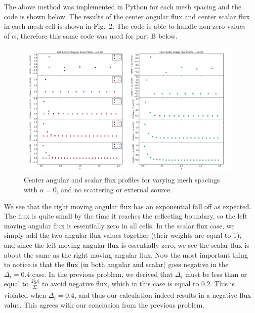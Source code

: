 \documentclass[10pt]{article}
\begin{document}
The above method was implemented in Python for each mesh spacing and the code is shown below. The results of the center angular flux and center scalar flux in each mesh cell is shown in Fig.~2. The code is able to handle non-zero values of $\alpha$, therefore this same code was used for part B below. \\



\begin{figure}[H]
    \centering
    \includegraphics[width=\textwidth]{Figures/FluxProfile_a=0}
    \caption{Center angular and scalar flux profiles for varying mesh spacings with $\alpha = 0$, and no scattering or external source.}
    \label{fig2}
\end{figure}

We see that the right moving angular flux has an exponential fall off as expected. The flux is quite small by the time it reaches the reflecting boundary, so the left moving angular flux is essentially zero in all cells. In the scalar flux case, we simply add the two angular flux values together (their weights are equal to 1), and since the left moving angular flux is essentially zero, we see the scalar flux is about the same as the right moving angular flux. Now the most important thing to notice is that the flux (in both angular and scalar) goes negative in the $\Delta_i = 0.4$ case. In the previous problem, we derived that $\Delta_i$ must be less than or equal to $\frac{2|\mu|}{\Sigma_t}$ to avoid negative flux, which in this case is equal to 0.2. This is violated  when $\Delta_i = 0.4$, and thus our calculation indeed results in a negative flux value. This agrees with our conclusion from the previous problem.

%
%
%
\end{document}
